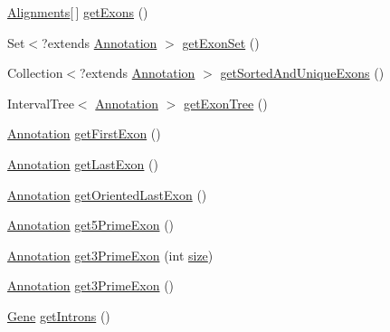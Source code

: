 \begin{DoxyCompactItemize}
\hyperlink{classbroad_1_1pda_1_1datastructures_1_1_alignments}{Alignments}\mbox{[}$\,$\mbox{]} \hyperlink{classumms_1_1core_1_1annotation_1_1_gene_a162487714a4f65542311eae90cb2f30a}{get\+Exons} ()
\item 
Set$<$?extends \hyperlink{interfaceumms_1_1core_1_1annotation_1_1_annotation}{Annotation} $>$ \hyperlink{classumms_1_1core_1_1annotation_1_1_gene_aa06c5697c4ec73b9257a826ab1060149}{get\+Exon\+Set} ()
\item 
Collection$<$?extends \hyperlink{interfaceumms_1_1core_1_1annotation_1_1_annotation}{Annotation} $>$ \hyperlink{classumms_1_1core_1_1annotation_1_1_gene_afa5372b27652f6e5788049f428e6a7a8}{get\+Sorted\+And\+Unique\+Exons} ()
\item 
Interval\+Tree$<$ \hyperlink{interfaceumms_1_1core_1_1annotation_1_1_annotation}{Annotation} $>$ \hyperlink{classumms_1_1core_1_1annotation_1_1_gene_a676460934bac3cd7775637c8f43b11b8}{get\+Exon\+Tree} ()
\item 
\hyperlink{interfaceumms_1_1core_1_1annotation_1_1_annotation}{Annotation} \hyperlink{classumms_1_1core_1_1annotation_1_1_gene_ab45c89fb5975cdbc4b1aee97a531ac20}{get\+First\+Exon} ()
\item 
\hyperlink{interfaceumms_1_1core_1_1annotation_1_1_annotation}{Annotation} \hyperlink{classumms_1_1core_1_1annotation_1_1_gene_a0564f0d47e80de0bcef1407df7645780}{get\+Last\+Exon} ()
\item 
\hyperlink{interfaceumms_1_1core_1_1annotation_1_1_annotation}{Annotation} \hyperlink{classumms_1_1core_1_1annotation_1_1_gene_a265d68946dbee7ee557fc7d3936246b1}{get\+Oriented\+Last\+Exon} ()
\item 
\hyperlink{interfaceumms_1_1core_1_1annotation_1_1_annotation}{Annotation} \hyperlink{classumms_1_1core_1_1annotation_1_1_gene_aa9b9af2ec900d1fcf2cb4754a5bdccdd}{get5\+Prime\+Exon} ()
\item 
\hyperlink{interfaceumms_1_1core_1_1annotation_1_1_annotation}{Annotation} \hyperlink{classumms_1_1core_1_1annotation_1_1_gene_a402966c4490f62bffd11bbdff30aef78}{get3\+Prime\+Exon} (int \hyperlink{classumms_1_1core_1_1annotation_1_1_abstract_annotation_acfe7f4b4188dabba73d9d53de81f240f}{size})
\item 
\hyperlink{interfaceumms_1_1core_1_1annotation_1_1_annotation}{Annotation} \hyperlink{classumms_1_1core_1_1annotation_1_1_gene_ad0a5e9f48b012eae2edbb60094f2829e}{get3\+Prime\+Exon} ()
\item 
\hyperlink{classumms_1_1core_1_1annotation_1_1_gene}{Gene} \hyperlink{classumms_1_1core_1_1annotation_1_1_gene_a2738757f1768d271c10b12e6f5a498d0}{get\+Introns} ()

\end{DoxyCompactItemize}
